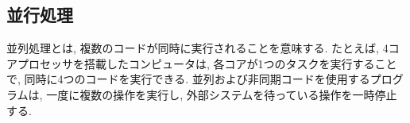 \documentclass[../../../main]{subfiles}
\begin{document}
    \subsection{並行処理}\label{subsec:phraseology-concurrency}

    並列処理とは, 複数のコードが同時に実行されることを意味する.  たとえば, 4コアプロセッサを搭載したコンピュータは, 各コアが1つのタスクを実行することで, 同時に4つのコードを実行できる. 並列および非同期コードを使用するプログラムは, 一度に複数の操作を実行し, 外部システムを待っている操作を一時停止する.
\end{document}
